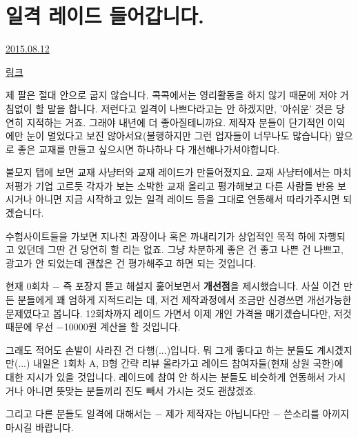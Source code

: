 
\section{일격 레이드 들어갑니다.}
\href{https://www.kockoc.com/Apoc/246737}{2015.08.12}

\vspace{5mm}

\href{http://kockoc.com/BookRaid/245328}{링크}
\vspace{5mm}

제 팔은 절대 안으로 굽지 않습니다.
콕콕에서는 영리활동을 하지 않기 때문에 저야 거침없이 할 말을 합니다.
저런다고 일격이 나쁘다라고는 안 하겠지만, '아쉬운' 것은 당연히 지적하는 거죠. 그래야 내년에 더 좋아질테니까요.
제작자 분들이 단기적인 이익에만 눈이 멀었다고 보진 않아서요(불행하지만 그런 업자들이 너무나도 많습니다)
앞으로 좋은 교재를 만들고 싶으시면 하나하나 다 개선해나가셔야합니다.
\vspace{5mm}

불모지 탭에 보면 교재 사냥터와 교재 레이드가 만들어졌지요.
교재 사냥터에서는 마치 저평가 기업 고르듯 각자가 보는 소박한 교재 올리고 평가해보고 다른 사람들 반응 보시거나
아니면 지금 시작하고 있는 일격 레이드 등을 그대로 연동해서 따라가주시면 되겠습니다.
\vspace{5mm}

수험사이트들을 가보면 지나친 과장이나 혹은 까내리기가 상업적인 목적 하에 자행되고 있던데 그딴 건 당연히 할 리는 없죠.
그냥 차분하게 좋은 건 좋고 나쁜 건 나쁘고, 광고가 안 되었는데 괜찮은 건 평가해주고 하면 되는 것입니다.
\vspace{5mm}

현재 0회차 $-$ 즉 포장지 뜯고 해설지 훑어보면서 \textbf{개선점}을 제시했습니다.
사실 이건 만든 분들에게 꽤 엄하게 지적드리는 데, 저건 제작과정에서 조금만 신경쓰면 개선가능한 문제였다고 봅니다.
12회차까지 레이드 가면서 이제 개인 가격을 매기겠습니다만, 저것 때문에 우선 $-$10000원 계산을 할 것입니다.
\vspace{5mm}

그래도 적어도 손발이 사라진 건 다행(...)입니다. 뭐 그게 좋다고 하는 분들도 계시겠지만(...)
내일은 1회차 A, B형 간략 리뷰 올라가고 레이드 참여자들(현재 상원 국한)에 대한 지시가 있을 것입니다.
레이드에 참여 안 하시는 분들도 비슷하게 연동해서 가시거나 아니면 뜻맞는 분들끼리 진도 빼서 가시는 것도 괜찮겠죠.
\vspace{5mm}

그리고 다른 분들도 일격에 대해서는 $-$ 제가 제작자는 아닙니다만 $-$ 쓴소리를 아끼지 마시길 바랍니다.
\vspace{5mm}

